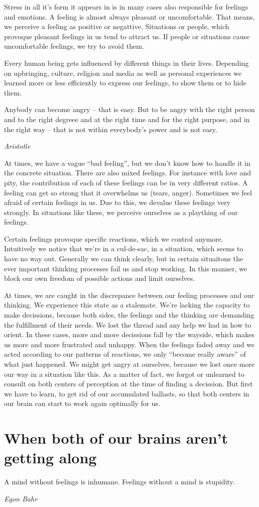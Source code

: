 \documentclass[../main.tex]{subfiles}
\begin{document}
Stress in all it's form it appears in is in many cases also responsible for feelings and emotions.
A feeling is almost always pleasant or uncomfortable.
That means, we perceive a feeling as positive or negattive.
Situations or people, which provoque pleasant feelings in us tend to attract us.
If people or situations cause uncomfortable feelings, we try to avoid them.

Every human being gets influenced by different things in their lives.
Depending on upbringing, culture, religion and media as well as personal experiences we learned more or less efficiently to express our feelings, to show them or to hide them.

\epigraph{Anybody can become angry -- that is easy. But to be angry with the right person and to the right degreee and at the right time and for the right purpose, and in the right way -- that is not within everybody's power and is not easy.}{\textit{Aristotle}}


At times, we have a vague ``bad feeling'', but we don't know how to handle it in the concrete situation.
There are also mixed feelings.
For instance with love and pity, the contribution of each of these feelings can be in very different ratios.
A feeling can get so strong that it overwhelms us (tears, anger).
Sometimes we feel afraid of certain feelings in us.
Due to this, we devalue these feelings very strongly.
In situations like these, we perceive ourselves as a plaything of our feelings.

Certain feelings provoque specific reactions, which we control anymore.
Intuitively we notice that we're in a cul-de-sac, in a situation, which seems to have no way out.
Generally we can think clearly, but in certain situaitons the ever important thinking processes fail us and stop working.
In this manner, we block our own freedom of possible actions and limit ourselves.

At times, we are caught in the discrepance between our feeling processes and our thinking.
We experience this state as a stalemate.
We're lacking the capacity to make decissions, because both sides, the feelings and the thinking are demanding the fulfillment of their needs.
We lost the thread and any help we had in how to orient.
In these cases, more and more decissions fall by the wayside, which makes us more and more frustrated and unhappy.
When the feelings faded away and we acted according to our patterns of reactions, we only ``become really aware'' of what just happened.
We might get angry at ourselves, because we lost once more our way in a situation like this.
As a matter of fact, we forgot or unlearned to consult on both centers of perception at the time of finding a decission.
But first we have to learn, to get rid of our accumulated ballasts, so that both centers in our brain can start to work again optimally for us.

\section{When both of our brains aren't getting along}

\epigraph{A mind without feelings is inhumane. Feelings without a mind is stupidity.}{\textit{Egon Bahr}}
\end{document}
